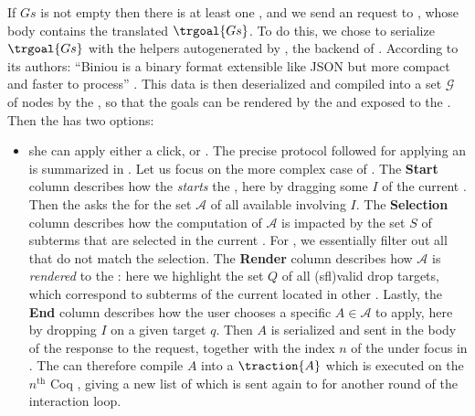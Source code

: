 \AP
If $Gs$ is not empty then there is at least one , and we send an
  request to , whose body contains the
translated  $\trgoal{Gs}$. To do this, we chose to serialize
$\trgoal{Gs}$ with the  helpers autogenerated by ,
the  backend of . According to its authors: ``Biniou is a
binary format extensible like JSON but more compact and faster to process''
\cite{atdgen}. This data is then deserialized and compiled into a set
$\mathcal{G}$ of   nodes by the , so that
the goals can be rendered by the  and exposed to the
. Then the  has two options:
\begin{itemize}
  \item she can apply either a click,  or . The precise protocol followed for
  applying an  is summarized in . Let us focus on
  the more complex case of  . The \textbf{Start} column describes
  how the  \emph{starts} the , here by dragging some
   $I$ of the current . Then the  asks
  the  for the set $\mathcal{A}$ of all available 
   involving $I$. The \textbf{Selection} column describes how the
  computation of $\mathcal{A}$ is impacted by the set $S$ of subterms that are
  selected in the current . For  , we essentially
  filter out all  that do not match the selection. The
  \textbf{Render} column describes how $\mathcal{A}$ is \emph{rendered} to the
  : here we highlight the set $Q$ of all \kl(sfl){valid} drop
  targets, which correspond to subterms of the current  located in
  other . Lastly, the \textbf{End}
  column describes how the user chooses a specific  $A \in \mathcal{A}$ to
  apply, here by dropping $I$ on a given target $q$. Then $A$ is serialized and
  sent in the body of the response to the  request, together
  with the index $n$ of the  under focus in . The
   can therefore compile $A$ into a  $\traction{A}$
  which is executed on the $n^{\text{th}}$ Coq , giving a new list
  of  which is sent again to  for another round of the
  interaction loop.


\end{itemize}
